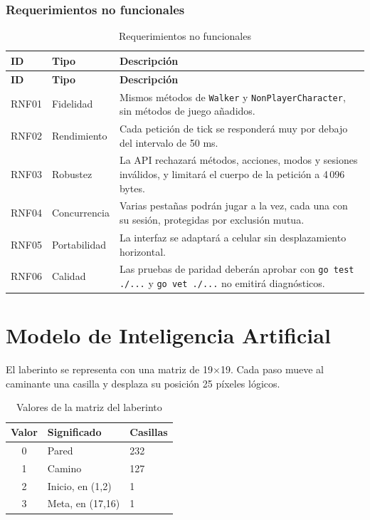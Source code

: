 \documentclass[12pt,a4paper]{article}
\begin{document}
\subsubsection{Requerimientos no funcionales}
\begin{longtable}{p{1.3cm}p{2.9cm}p{9.2cm}}
\caption{Requerimientos no funcionales}\\
\toprule
\textbf{ID} & \textbf{Tipo} & \textbf{Descripción}\\
\midrule\endfirsthead
\toprule
\textbf{ID} & \textbf{Tipo} & \textbf{Descripción}\\
\midrule\endhead
RNF01 & Fidelidad & Mismos métodos de \texttt{Walker} y \texttt{NonPlayerCharacter}, sin métodos de juego añadidos.\\
RNF02 & Rendimiento & Cada petición de tick se responderá muy por debajo del intervalo de 50 ms.\\
RNF03 & Robustez & La API rechazará métodos, acciones, modos y sesiones inválidos, y limitará el cuerpo de la petición a 4\,096 bytes.\\
RNF04 & Concurrencia & Varias pestañas podrán jugar a la vez, cada una con su sesión, protegidas por exclusión mutua.\\
RNF05 & Portabilidad & La interfaz se adaptará a celular sin desplazamiento horizontal.\\
RNF06 & Calidad & Las pruebas de paridad deberán aprobar con \texttt{go test ./...} y \texttt{go vet ./...} no emitirá diagnósticos.\\
\bottomrule
\end{longtable}

\section{Modelo de Inteligencia Artificial}
El laberinto se representa con una matriz de 19$\times$19. Cada paso mueve al
caminante una casilla y desplaza su posición 25 píxeles lógicos.

\begin{table}[H]
\centering
\caption{Valores de la matriz del laberinto}
\begin{tabular}{cll}
\toprule
\textbf{Valor} & \textbf{Significado} & \textbf{Casillas}\\
\midrule
0 & Pared & 232\\
1 & Camino & 127\\
2 & Inicio, en (1,2) & 1\\
3 & Meta, en (17,16) & 1\\
\bottomrule
\end{tabular}
\end{table}
\end{document}
